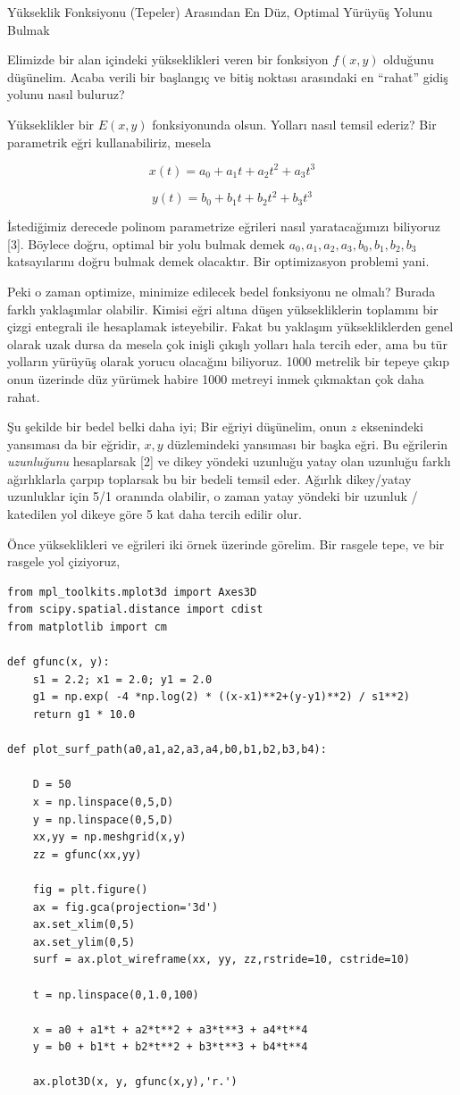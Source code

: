 \documentclass[12pt,fleqn]{article}\usepackage{../../common}
\begin{document}
Yükseklik Fonksiyonu (Tepeler) Arasından En Düz, Optimal Yürüyüş Yolunu Bulmak

Elimizde bir alan içindeki yükseklikleri veren bir fonksiyon $f(x,y)$
olduğunu düşünelim. Acaba verili bir başlangıç ve bitiş noktası arasındaki
en ``rahat'' gidiş yolunu nasıl buluruz? 

Yükseklikler bir $E(x,y)$ fonksiyonunda olsun. Yolları nasıl temsil ederiz?
Bir parametrik eğri kullanabiliriz, mesela 

$$
x(t) = a_0 + a_1 t + a_2 t^2 + a_3 t^3
$$

$$
y(t) = b_0 + b_1 t + b_2 t^2 + b_3 t^3
$$

İstediğimiz derecede polinom parametrize eğrileri nasıl yaratacağımızı
biliyoruz [3]. Böylece doğru, optimal bir yolu bulmak demek
$a_0,a_1,a_2,a_3,b_0,b_1,b_2,b_3$ katsayılarını doğru bulmak demek
olacaktır. Bir optimizasyon problemi yani.

Peki o zaman optimize, minimize edilecek bedel fonksiyonu ne olmalı? Burada
farklı yaklaşımlar olabilir. Kimisi eğri altına düşen yüksekliklerin
toplamını bir çizgi entegrali ile hesaplamak isteyebilir. Fakat bu yaklaşım
yüksekliklerden genel olarak uzak dursa da mesela çok inişli çıkışlı
yolları hala tercih eder, ama bu tür yolların yürüyüş olarak yorucu
olacağını biliyoruz. 1000 metrelik bir tepeye çıkıp onun üzerinde düz
yürümek habire 1000 metreyi inmek çıkmaktan çok daha rahat.

Şu şekilde bir bedel belki daha iyi; Bir eğriyi düşünelim, onun $z$
eksenindeki yansıması da bir eğridir, $x,y$ düzlemindeki yansıması bir
başka eğri. Bu eğrilerin {\em uzunluğunu} hesaplarsak [2] ve dikey yöndeki
uzunluğu yatay olan uzunluğu farklı ağırlıklarla çarpıp toplarsak bu bir
bedeli temsil eder. Ağırlık dikey/yatay uzunluklar için 5/1 oranında
olabilir, o zaman yatay yöndeki bir uzunluk / katedilen yol dikeye göre 5
kat daha tercih edilir olur.

Önce yükseklikleri ve eğrileri iki örnek üzerinde görelim. Bir rasgele
tepe, ve bir rasgele yol çiziyoruz,

\begin{verbatim}
from mpl_toolkits.mplot3d import Axes3D
from scipy.spatial.distance import cdist
from matplotlib import cm

def gfunc(x, y):
    s1 = 2.2; x1 = 2.0; y1 = 2.0
    g1 = np.exp( -4 *np.log(2) * ((x-x1)**2+(y-y1)**2) / s1**2)
    return g1 * 10.0

def plot_surf_path(a0,a1,a2,a3,a4,b0,b1,b2,b3,b4):

    D = 50
    x = np.linspace(0,5,D)
    y = np.linspace(0,5,D)
    xx,yy = np.meshgrid(x,y)
    zz = gfunc(xx,yy)

    fig = plt.figure()
    ax = fig.gca(projection='3d')
    ax.set_xlim(0,5)
    ax.set_ylim(0,5)
    surf = ax.plot_wireframe(xx, yy, zz,rstride=10, cstride=10)

    t = np.linspace(0,1.0,100)

    x = a0 + a1*t + a2*t**2 + a3*t**3 + a4*t**4 
    y = b0 + b1*t + b2*t**2 + b3*t**3 + b4*t**4

    ax.plot3D(x, y, gfunc(x,y),'r.')
\end{verbatim}
\end{document}
